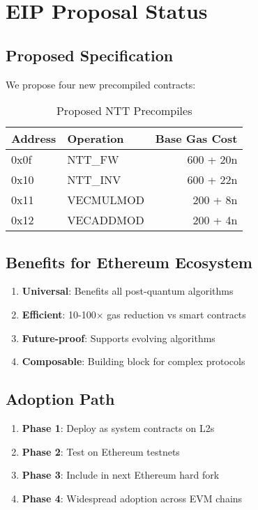 \documentclass[11pt,a4paper]{article}
\begin{document}
\section{EIP Proposal Status}

\subsection{Proposed Specification}

We propose four new precompiled contracts:

\begin{table}[h]
\centering
\caption{Proposed NTT Precompiles}
\begin{tabular}{llr}
\toprule
Address & Operation & Base Gas Cost \\
\midrule
0x0f & NTT\_FW & 600 + 20n \\
0x10 & NTT\_INV & 600 + 22n \\
0x11 & VECMULMOD & 200 + 8n \\
0x12 & VECADDMOD & 200 + 4n \\
\bottomrule
\end{tabular}
\end{table}

\subsection{Benefits for Ethereum Ecosystem}

\begin{enumerate}
\item \textbf{Universal}: Benefits all post-quantum algorithms
\item \textbf{Efficient}: 10-100× gas reduction vs smart contracts
\item \textbf{Future-proof}: Supports evolving algorithms
\item \textbf{Composable}: Building block for complex protocols
\end{enumerate}

\subsection{Adoption Path}

\begin{enumerate}
\item \textbf{Phase 1}: Deploy as system contracts on L2s
\item \textbf{Phase 2}: Test on Ethereum testnets
\item \textbf{Phase 3}: Include in next Ethereum hard fork
\item \textbf{Phase 4}: Widespread adoption across EVM chains
\end{enumerate}
\end{document}
